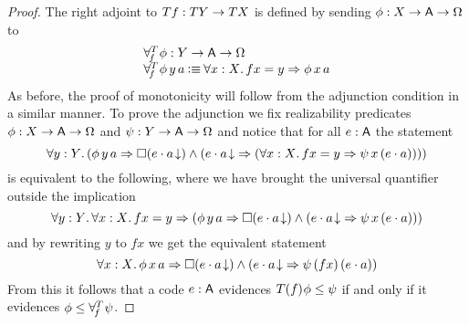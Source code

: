 \documentclass[11pt]{article}
\begin{document}
\begin{proof}
  The right adjoint to \(T{f} : T{Y} \to T{X}\) is defined by
  sending \(\phi : {{X}\to{{{\ensuremath{\mathsf{A}}}\to{\Omega}}}}\) to
  \[
    \begin{array}{l}
      \forall^{T}_{\!{f}}\mspace{1mu}{\phi} : {{Y}\to{{{\ensuremath{\mathsf{A}}}\to{\Omega}}}}\\
      {\forall^{T}_{\!{f}}\mspace{1mu}{\phi}\,y\,a}\mathbin{\vcentcolon\equiv} {\forall{x:X}.\,{{fx=y}\Rightarrow{\phi\,x\,a}}}
    \end{array}
  \]
  As before, the proof of monotonicity will follow from the adjunction
  condition in a similar manner.
  To prove the adjunction we fix realizability predicates \(\phi:{{X}\to{{{\ensuremath{\mathsf{A}}}\to{\Omega}}}}\)
  and \(\psi:{{Y}\to{{{\ensuremath{\mathsf{A}}}\to{\Omega}}}}\) and notice that for all \(e:\mathsf{A}\) the statement
  \[
    \IForall%
    {y:Y}%
    {(\IImplies%
      {\phi\,y\,a}%
      {\IAnd%
        {\IBox{(\ITotal{\IAp{e}{a}})}}%
        {(\IImplies%
          {\ITotal{\IAp{e}{a}}}%
          {(\IForall{x:X}{\IImplies{fx=y}{\psi\,x\,(\IAp{e}{a})}})})%
        }})}
  \]
  is equivalent to the following, where we have brought the universal quantifier
  outside the implication
  \[
    \IForall%
    {y:Y}%
    {\IForall%
      {x:X}%
      {\IImplies%
        {fx=y}%
        {(\IImplies%
          {\phi\,y\,a}%
          {\IAnd%
            {\IBox{(\ITotal{\IAp{e}{a}})}}%
            {(\IImplies%
              {\ITotal{\IAp{e}{a}}}%
              {\psi\,x\,(\IAp{e}{a})})%
            }})}}}
  \]
  and by rewriting \(y\) to \(fx\) we get the equivalent statement
  \[
    \IForall%
    {x:X}%
    {\IImplies%
      {\phi\,x\,a}%
      {\IAnd%
        {\IBox{(\ITotal{\IAp{e}{a}})}}%
        {(\IImplies%
          {\ITotal{\IAp{e}{a}}}%
          {\psi\,(fx)\,(\IAp{e}{a})})%
        }}}
  \]
  From this it follows that a code \(e:\mathsf{A}\) evidences
  \({T{(}{f})\mspace{1mu}{\phi}}\leq{\psi}\) if and only if it evidences
  \({\phi}\leq{\forall^{T}_{\!{f}}\mspace{1mu}{\psi}}\).
\end{proof}
\end{document}
